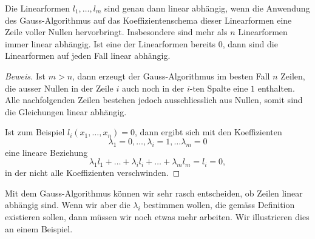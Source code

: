 \begin{hilfssatz}
Die Linearformen $l_1,\dots,l_m$ sind genau dann linear abhängig, wenn
die Anwendung des Gauss-Algorithmus auf das Koeffizientenschema dieser
Linearformen eine Zeile voller Nullen hervorbringt.
Insbesondere sind mehr als $n$ Linearformen immer linear abhängig.
Ist eine der Linearformen
bereits $0$, dann sind die Linearformen auf jeden Fall linear abhängig.
\end{hilfssatz}

\begin{proof}[Beweis]
Ist $m>n$, dann erzeugt der Gauss-Algorithmus im besten Fall $n$ Zeilen,
die ausser Nullen in der Zeile $i$ auch noch in der $i$-ten Spalte eine
$1$ enthalten.
Alle nachfolgenden Zeilen bestehen jedoch ausschliesslich
aus Nullen, somit sind die Gleichungen linear abhängig.

Ist zum Beispiel $l_i(x_1,\dots,x_n)=0$, dann ergibt sich mit den
Koeffizienten
\[
\lambda_1=0,\dots,\lambda_i=1,\dots \lambda_m=0
\]
eine lineare Beziehung
\[
\lambda_1l_1+\dots+\lambda_il_i+\dots+\lambda_ml_m=l_i=0,
\]
in der nicht alle Koeffizienten verschwinden.
\end{proof}

Mit dem Gauss-Algorithmus können wir sehr rasch entscheiden, ob Zeilen 
linear abhängig sind.
Wenn wir aber die $\lambda_i$ bestimmen wollen,
die gemäss Definition existieren sollen, dann müssen wir noch etwas
mehr arbeiten.
Wir illustrieren dies an einem Beispiel.

